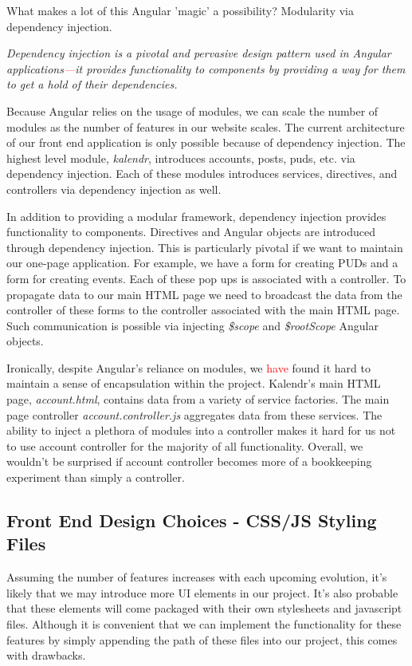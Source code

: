 \documentclass[a4paper]{article}
\newcommand{\comment}[1]{\textcolor{red}{#1}}
\begin{document}
What makes a lot of this Angular 'magic' a possibility? Modularity via dependency injection.

\begin{center}
\textit{Dependency injection is a pivotal and pervasive design pattern used in Angular applications\comment{---}it provides functionality to components by providing a way for them to get a hold of their dependencies.}
\end{center}

Because Angular relies on the usage of modules, we can scale the number of modules as the number of features in our website scales. The current architecture of our front end application is only possible because of dependency injection. The highest level module, \textit{kalendr}, introduces accounts, posts, puds, etc. via dependency injection. Each of these modules introduces services, directives, and controllers via dependency injection as well.

In addition to providing a modular framework, dependency injection provides functionality to components. Directives and Angular objects are introduced through dependency injection. This is particularly pivotal if we want to maintain our one-page application. For example, we have a form for creating PUDs and a form for creating events. Each of these pop ups is associated with a controller. To propagate data to our main HTML page we need to broadcast the data from the controller of these forms to the controller associated with the main HTML page. Such communication is possible via injecting \textit{\$scope} and \textit{\$rootScope} Angular objects.

Ironically, despite Angular's reliance on modules, we \comment{have} found it hard to maintain a sense of encapsulation within the project. Kalendr's main HTML page, \textit{account.html}, contains data from a variety of service factories. The main page controller \textit{account.controller.js} aggregates data from these services. The ability to inject a plethora of modules into a controller makes it hard for us not to use account controller for the majority of all functionality. Overall, we wouldn't be surprised if account controller becomes more of a bookkeeping experiment than simply a controller.

\subsection{Front End Design Choices - CSS/JS Styling Files}

Assuming the number of features increases with each upcoming evolution, it's likely that we may introduce more UI elements in our project. It's also probable that these elements will come packaged with their own stylesheets and javascript files. Although it is convenient that we can implement the functionality for these features by simply appending the path of these files into our project, this comes with drawbacks. 
\end{document}
